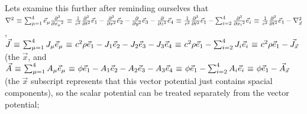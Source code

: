 \documentclass{article}
\begin{document}
Lets examine this further after reminding ourselves that \begin{math} \nabla^2 \hspace{0.025cm} \equiv \hspace{0.025cm} \sum_{\mu = 1}^{4} \vec{e}_{\mu} \frac{\partial^2}{\partial{x_{\mu}}^2} \hspace{0.025cm} \equiv \hspace{0.025cm} \frac{1}{c^2} \frac{\partial^2}{\partial{t}^2} \vec{e}_1 - \frac{\partial^2}{\partial{x}^2} \vec{e}_2 - \frac{\partial}{\partial{y}^2} \vec{e}_3 - \frac{\partial}{\partial{z}^2} \vec{e}_4 \hspace{0.025cm} \equiv \hspace{0.025cm} \frac{1}{c^2} \frac{\partial^2}{\partial{t}^2} \vec{e}_1 - \sum_{i = 2}^{4} \frac{\partial^2}{\partial{x_i}^2} \vec{e}_i \hspace{0.025cm} \equiv \hspace{0.025cm} \frac{1}{c^2} \frac{\partial^2}{\partial{t}^2} \vec{e}_1 - \nabla_{\vec{x}}^2 \end{math}, \begin{math} \vec{J} \hspace{0.025cm} \equiv \hspace{0.025cm} \sum_{\mu = 1}^{4} J_{\mu} \vec{e}_{\mu} \hspace{0.025cm} \equiv \hspace{0.025cm} c^2 \rho \vec{e}_1 - J_1 \vec{e}_2 - J_2 \vec{e}_3 - J_3 \vec{e}_4 \hspace{0.025cm} \equiv \hspace{0.025cm} c^2 \rho \vec{e}_1 - \sum_{i = 2}^{4} J_i \vec{e}_i \hspace{0.025cm} \equiv \hspace{0.025cm} c^2 \rho  \vec{e}_1 - \vec{J}_{\vec{x}} \end{math} (the \begin{math} \vec{x} \end{math}, and \begin{math} \vec{A} \hspace{0.025cm} \equiv \hspace{0.025cm} \sum_{\mu = 1}^{4} A_{\mu} \vec{e}_{\mu} \hspace{0.025cm} \equiv \hspace{0.025cm} \phi \vec{e}_1 - A_1 \vec{e}_2 - A_2 \vec{e}_3 - A_3 \vec{e}_4 \hspace{0.025cm} \equiv \hspace{0.025cm} \phi \vec{e}_1 - \sum_{i = 2}^{4} A_i \vec{e}_i \hspace{0.025cm} \equiv \hspace{0.025cm} \phi \vec{e}_1 - \vec{A}_{\vec{x}} \end{math} (the \begin{math} \vec{x} \end{math} subscript represents that this vector potential just contains spacial components), so the scalar potential can be treated separately from the vector potential;
\end{document}
